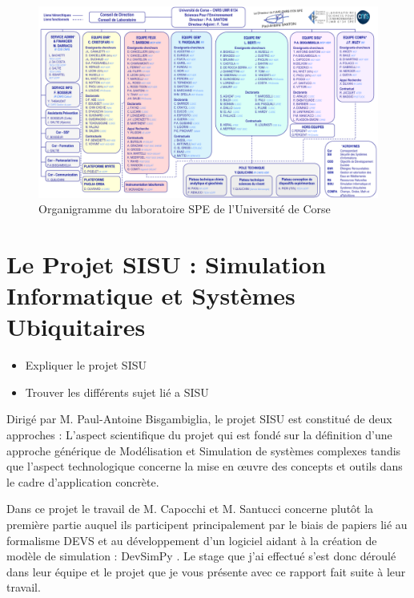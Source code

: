 \documentclass{rapport_stage}
\begin{document}
\begin{figure}[ht]
  \centering
  \includegraphics[width=15cm]{figures/Organigramme_UMR.pdf}
  \caption{Organigramme du laboratoire SPE de l'Université de Corse \cite{santoni_presentation_2022}}
  \label{fig:Organigramme-SPE}
\end{figure}


\section*{Le Projet SISU : Simulation Informatique et Systèmes Ubiquitaires}

\begin{itemize}[label=$\bullet$]
  \item Expliquer le projet SISU
  \item Trouver les différents sujet lié a SISU
\end{itemize}

Dirigé par M. Paul-Antoine Bisgambiglia, le projet SISU est constitué de deux approches :
L'aspect scientifique du projet qui est fondé sur la définition d'une approche générique de
Modélisation et Simulation de systèmes complexes tandis que l'aspect technologique concerne
la mise en œuvre des concepts et outils dans le cadre d'application concrète.

Dans ce projet le travail de M. Capocchi et M. Santucci concerne plutôt la première partie
auquel ils participent principalement par le biais de papiers lié au formalisme DEVS
\cite{capocchi_devs_2022} \cite{capocchi_towards_2023} et au développement d'un logiciel aidant à
la création de modèle de simulation : DevSimPy \cite{l_what_2023}. Le stage que j'ai effectué
s'est donc déroulé dans leur équipe et le projet que je vous présente avec ce rapport fait suite
à leur travail.
\end{document}
